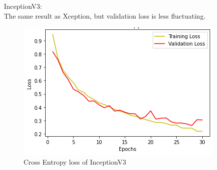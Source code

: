 \documentclass[sigconf]{acmart}
\begin{document}
InceptionV3:\\
The same result as Xception, but validation loss is less fluctuating.\\
\begin{figure}[h]
  \centering
 
  \includegraphics[width=\linewidth]{../supplements/6.inception.png}
 
  \caption{Cross Entropy loss of InceptionV3
}
  \label{Fig.8}
\end{figure}
\end{document}
